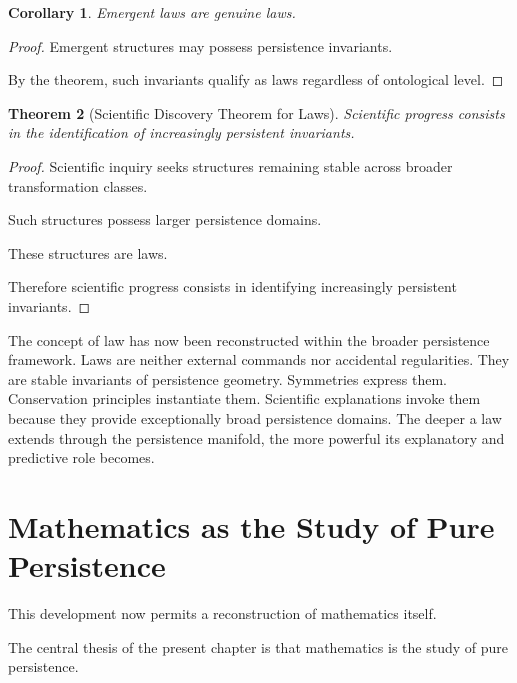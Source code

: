 \documentclass[12pt,oneside]{article}
\newtheorem{theorem}{Theorem}[section] \newtheorem{lemma}[theorem]{Lemma} \newtheorem{proposition}[theorem]{Proposition} \newtheorem{corollary}[theorem]{Corollary}
\theoremstyle{definition}
\begin{document}
\begin{corollary}

Emergent laws are genuine laws.

\end{corollary}

\begin{proof}

Emergent structures may possess persistence invariants.

By the theorem, such invariants qualify as laws regardless of ontological level.

\end{proof}

\begin{theorem}[Scientific Discovery Theorem for Laws]

Scientific progress consists in the identification of increasingly persistent invariants.

\end{theorem}

\begin{proof}

Scientific inquiry seeks structures remaining stable across broader transformation classes.

Such structures possess larger persistence domains.

These structures are laws.

Therefore scientific progress consists in identifying increasingly persistent invariants.

\end{proof}

The concept of law has now been reconstructed within the broader persistence framework. Laws are neither external commands nor accidental regularities. They are stable invariants of persistence geometry. Symmetries express them. Conservation principles instantiate them. Scientific explanations invoke them because they provide exceptionally broad persistence domains. The deeper a law extends through the persistence manifold, the more powerful its explanatory and predictive role becomes.

\section{Mathematics as the Study of Pure Persistence}

This development now permits a reconstruction of mathematics itself.

The central thesis of the present chapter is that mathematics is the study of pure persistence.
\end{document}
